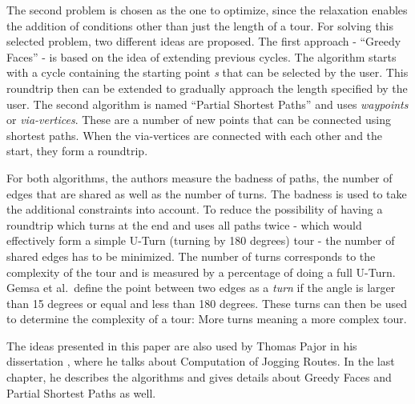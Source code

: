 The second problem is chosen as the one to optimize, since the relaxation enables the addition of conditions other than just the length of a tour.
For solving this selected problem, two different ideas are proposed.
The first approach - \enquote{Greedy Faces} - is based on the idea of extending previous cycles.
The algorithm starts with a cycle containing the starting point \textit{s} that can be selected by the user. 
This roundtrip then can be extended to gradually approach the length specified by the user. 
The second algorithm is named \enquote{Partial Shortest Paths} and uses \textit{waypoints} or \textit{via-vertices}.
These are a number of new points that can be connected using shortest paths.
When the via-vertices are connected with each other and the start, they form a roundtrip.


For both algorithms, the authors measure the badness of paths, the number of edges that are shared as well as the number of turns.
The badness is used to take the additional constraints into account. 
To reduce the possibility of having a roundtrip which turns at the end and uses all paths twice - which would effectively form a simple U-Turn (turning by 180 degrees) tour - the number of shared edges has to be minimized.
The number of turns corresponds to the complexity of the tour and is measured by a percentage of doing a full U-Turn. 
Gemsa et al.\ define the point between two edges as a \textit{turn} if the angle is larger than 15 degrees or equal and less than 180 degrees.
These turns can then be used to determine the complexity of a tour:
More turns meaning a more complex tour.

The ideas presented in this paper are also used by Thomas Pajor in his dissertation \cite{pajor_algorithm_2013}, where he talks about Computation of Jogging Routes. In the last chapter, he describes the algorithms and gives details about Greedy Faces and Partial Shortest Paths as well.

